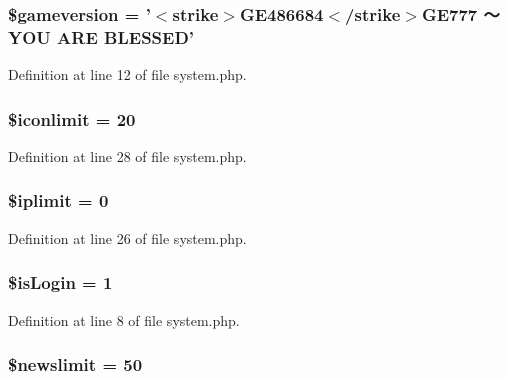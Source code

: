 \hypertarget{system_8php_ab8a69f249ba2d5bd093b97cf8c34d4e9}{
\subsubsection[{\$gameversion}]{\setlength{\rightskip}{0pt plus 5cm}\$gameversion = '$<$strike$>$G\+E486684$<$/strike$>$G\+E777 ～\+Y\+O\+U A\+R\+E B\+L\+E\+S\+S\+E\+D'}}\label{system_8php_ab8a69f249ba2d5bd093b97cf8c34d4e9}


Definition at line 12 of file system.\+php.

\hypertarget{system_8php_a9929d2e2890538be6fd05ead4bb4aeef}{
\subsubsection[{\$iconlimit}]{\setlength{\rightskip}{0pt plus 5cm}\$iconlimit = 20}}\label{system_8php_a9929d2e2890538be6fd05ead4bb4aeef}


Definition at line 28 of file system.\+php.

\hypertarget{system_8php_a310121f5d3ec43f5cfb1cf78d31814ec}{
\subsubsection[{\$iplimit}]{\setlength{\rightskip}{0pt plus 5cm}\$iplimit = 0}}\label{system_8php_a310121f5d3ec43f5cfb1cf78d31814ec}


Definition at line 26 of file system.\+php.

\hypertarget{system_8php_a0685b2eafc663b47272966940e0f63fa}{
\subsubsection[{\$is\+Login}]{\setlength{\rightskip}{0pt plus 5cm}\$is\+Login = 1}}\label{system_8php_a0685b2eafc663b47272966940e0f63fa}


Definition at line 8 of file system.\+php.

\hypertarget{system_8php_a66b46b16c2b88b5bac5a54bcc0bf20e9}{
\subsubsection[{\$newslimit}]{\setlength{\rightskip}{0pt plus 5cm}\$newslimit = 50}}\label{system_8php_a66b46b16c2b88b5bac5a54bcc0bf20e9}


